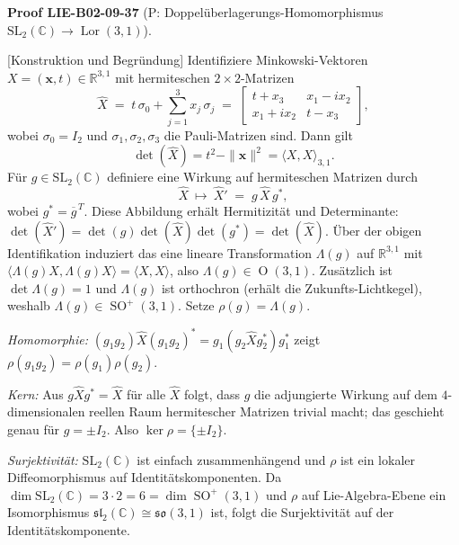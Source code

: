 \documentclass[10pt, letterpaper]{article}
\newcommand{\CustomHeading}[3]{%
  \par\medskip\noindent%
  \textbf{#1 #2} \textnormal{(#3)}.\enskip%
}
\newenvironment{PROOF}[2]{\begin{unitbox}\CustomHeading{Proof}{#1}{#2}}{\end{unitbox}}
\begin{document}
\begin{PROOF}{LIE-B02-09-37}{P: Doppelüberlagerungs-Homomorphismus \(\mathrm{SL}_2(\mathbb{C})\to \operatorname{Lor}(3,1)\)}
[Konstruktion und Begründung]
Identifiziere Minkowski-Vektoren \(X=(\mathbf{x},t)\in\mathbb{R}^{3,1}\) mit hermiteschen
\(2\times2\)-Matrizen
\[
\widehat X\;=\;t\,\sigma_0+\sum_{j=1}^3 x_j\,\sigma_j
\;=\;
\begin{bmatrix}
t+x_3 & x_1-ix_2\\
x_1+ix_2 & t-x_3
\end{bmatrix},
\]
wobei \(\sigma_0=I_2\) und \(\sigma_1,\sigma_2,\sigma_3\) die Pauli-Matrizen sind.
Dann gilt
\[
\det(\widehat X)=t^2-\|\mathbf{x}\|^2=\langle X,X\rangle_{3,1}.
\]
Für \(g\in \mathrm{SL}_2(\mathbb{C})\) definiere eine Wirkung auf hermiteschen Matrizen durch
\[
\widehat X\ \longmapsto\ \widehat X' \;=\; g\,\widehat X\, g^{*},
\]
wobei \(g^{*}=\overline g^{\,T}\).
Diese Abbildung erhält Hermitizität und Determinante:
\(\det(\widehat X')=\det(g)\det(\widehat X)\det(g^{*})=\det(\widehat X)\).
Über der obigen Identifikation induziert das eine lineare Transformation
\(\Lambda(g)\) auf \(\mathbb{R}^{3,1}\) mit
\(\langle \Lambda(g)X,\Lambda(g)X\rangle=\langle X,X\rangle\), also
\(\Lambda(g)\in \operatorname{O}(3,1)\).
Zusätzlich ist \(\det \Lambda(g)=1\) und \(\Lambda(g)\) ist orthochron (erhält die Zukunfts-Lichtkegel),
weshalb \(\Lambda(g)\in \operatorname{SO}^+(3,1)\).
Setze \(\rho(g)=\Lambda(g)\).

\emph{Homomorphie:} \((g_1g_2)\widehat X(g_1g_2)^*=g_1(g_2\widehat X g_2^*)g_1^*\) zeigt
\(\rho(g_1g_2)=\rho(g_1)\rho(g_2)\).

\emph{Kern:} Aus \(g\widehat X g^*=\widehat X\) für alle \(\widehat X\) folgt,
dass \(g\) die adjungierte Wirkung auf dem \(4\)-dimensionalen reellen Raum
hermitescher Matrizen trivial macht; das geschieht genau für \(g=\pm I_2\).
Also \(\ker\rho=\{\pm I_2\}\).

\emph{Surjektivität:} \(\mathrm{SL}_2(\mathbb{C})\) ist einfach zusammenhängend und
\(\rho\) ist ein lokaler Diffeomorphismus auf Identitätskomponenten.
Da \(\dim \mathrm{SL}_2(\mathbb{C})=3\cdot 2=6=\dim \operatorname{SO}^+(3,1)\)
und \(\rho\) auf Lie-Algebra-Ebene ein Isomorphismus
\(\mathfrak{sl}_2(\mathbb{C})\cong \mathfrak{so}(3,1)\) ist, folgt die Surjektivität
auf der Identitätskomponente.
\end{PROOF}
\end{document}
